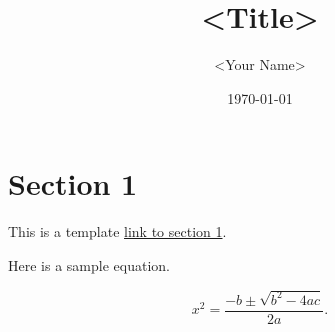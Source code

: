 \documentclass[12pt]{article}
\title{<Title>}
\author{<Your Name>}
\date{\today}
\makeatletter
\newcommand*{\toccontents}{\@starttoc{toc}}
\makeatother
\begin{document}
\maketitle

\tableofcontents

\section{Section 1}
\label{sec1}

This is a template \hyperref[sec1]{link to section 1}.

Here is a sample equation.

\begin{equation}
x^2 = \frac{-b \pm \sqrt{b^2 - 4ac}}{2a}.
\end{equation}
\end{document}
